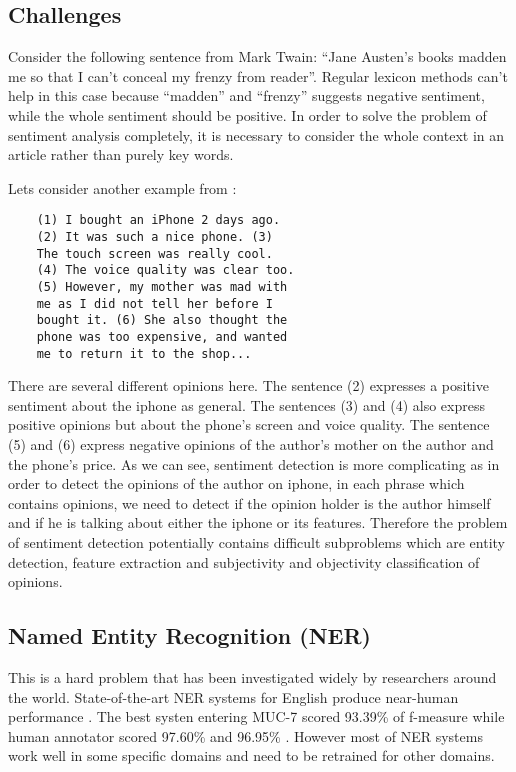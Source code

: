 \documentclass{article}
\begin{document}
\begin{multicols}{2}
\section{Challenges}
    Consider the following sentence from Mark Twain: ``Jane Austen's books
madden me so that I can't conceal my frenzy from reader''. Regular lexicon
methods can't help in this case because ``madden'' and ``frenzy'' suggests
negative sentiment, while the whole sentiment should be positive. In order to
solve the problem of sentiment analysis completely, it is necessary to consider
the whole context in an article rather than purely key words.
    
    Lets consider another example from \citet{Liu2010}:
    \begin{verbatim}
    (1) I bought an iPhone 2 days ago. 
    (2) It was such a nice phone. (3) 
    The touch screen was really cool. 
    (4) The voice quality was clear too. 
    (5) However, my mother was mad with 
    me as I did not tell her before I 
    bought it. (6) She also thought the 
    phone was too expensive, and wanted 
    me to return it to the shop...
    \end{verbatim}

    There are several different opinions here. The sentence (2) expresses
a positive sentiment about the iphone as general. The sentences (3) and
(4) also express positive opinions but about the phone's screen and voice
quality. The sentence (5) and (6) express negative opinions of the author's
mother on the author and the phone's price. As we can see, sentiment detection
is more complicating as in order to detect the opinions of the author on iphone,
in each phrase which contains opinions, we need to detect if the opinion holder
is the author himself and if he is talking about either the iphone or its
features. Therefore the problem of sentiment detection potentially contains
difficult subproblems which are entity detection, feature extraction
and subjectivity and objectivity classification of opinions.
  
  \subsection{Named Entity Recognition (NER)}
    This is a hard problem that has been investigated widely by researchers
around the world. State-of-the-art NER systems for English produce near-human
performance \citet{Wikipedia_NER}. The best systen entering MUC-7 scored 93.39\%
of f-measure while human annotator scored 97.60\% and 96.95\% \citet{Marsh1998}.
However most of NER systems work well in some specific domains and need to be
retrained for other domains.


\end{multicols}
\end{document}
